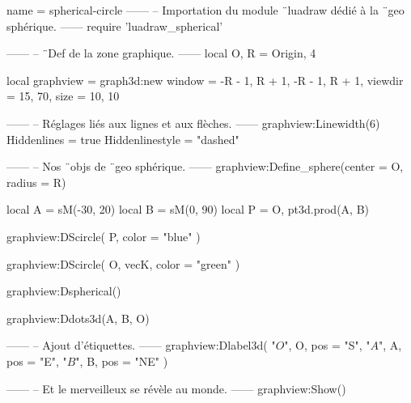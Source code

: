 \documentclass{standalone}
\begin{document}
\begin{luadraw}{name = spherical-circle}
------
-- Importation du module ¨luadraw dédié à la ¨geo sphérique.
------
require 'luadraw_spherical'

------
-- ¨Def de la zone graphique.
------
local O, R = Origin, 4

local graphview = graph3d:new{
  window  = {-R - 1, R + 1, -R - 1, R + 1},
  viewdir = {15, 70},
  size    = {10, 10}
}

------
-- Réglages liés aux lignes et aux flèches.
------
graphview:Linewidth(6)
Hiddenlines     = true
Hiddenlinestyle = "dashed"

------
-- Nos ¨objs de ¨geo sphérique.
------
graphview:Define_sphere({center = O, radius = R})

local A = sM(-30, 20)
local B = sM(0, 90)
local P = {O, pt3d.prod(A, B)}

graphview:DScircle(
  P,
  {color = "blue"}
)

graphview:DScircle(
  {O, vecK},
  {color = "green"}
)

graphview:Dspherical()

graphview:Ddots3d({A, B, O})

------
-- Ajout d'étiquettes.
------
graphview:Dlabel3d(
  "$O$", O, {pos = "S"},
  "$A$", A, {pos = "E"},
  "$B$", B, {pos = "NE"}
)

------
-- Et le merveilleux se révèle au monde.
------
graphview:Show()
\end{luadraw}
\end{document}
